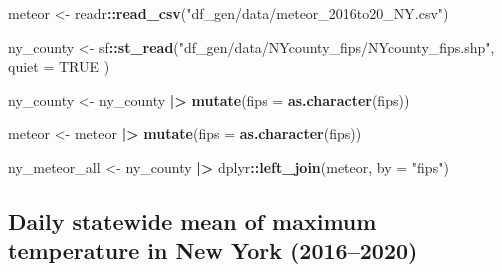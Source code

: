 \documentclass[
]{article}
\newenvironment{Shaded}{\begin{snugshade}}{\end{snugshade}}
\newcommand{\AttributeTok}[1]{\textcolor[rgb]{0.13,0.29,0.53}{#1}}
\newcommand{\ConstantTok}[1]{\textcolor[rgb]{0.56,0.35,0.01}{#1}}
\newcommand{\FunctionTok}[1]{\textcolor[rgb]{0.13,0.29,0.53}{\textbf{#1}}}
\newcommand{\NormalTok}[1]{#1}
\newcommand{\OtherTok}[1]{\textcolor[rgb]{0.56,0.35,0.01}{#1}}
\newcommand{\SpecialCharTok}[1]{\textcolor[rgb]{0.81,0.36,0.00}{\textbf{#1}}}
\newcommand{\StringTok}[1]{\textcolor[rgb]{0.31,0.60,0.02}{#1}}
\begin{document}
\begin{Shaded}
\begin{Highlighting}[]
\NormalTok{meteor }\OtherTok{\textless{}{-}}\NormalTok{ readr}\SpecialCharTok{::}\FunctionTok{read\_csv}\NormalTok{(}\StringTok{"df\_gen/data/meteor\_2016to20\_NY.csv"}\NormalTok{)}
\end{Highlighting}
\end{Shaded}

\begin{Shaded}
\begin{Highlighting}[]
\NormalTok{ny\_county }\OtherTok{\textless{}{-}}\NormalTok{ sf}\SpecialCharTok{::}\FunctionTok{st\_read}\NormalTok{(}\StringTok{"df\_gen/data/NYcounty\_fips/NYcounty\_fips.shp"}\NormalTok{,}
  \AttributeTok{quiet =} \ConstantTok{TRUE}
\NormalTok{)}
\end{Highlighting}
\end{Shaded}

\begin{Shaded}
\begin{Highlighting}[]
\NormalTok{ny\_county }\OtherTok{\textless{}{-}}\NormalTok{ ny\_county }\SpecialCharTok{|\textgreater{}}
  \FunctionTok{mutate}\NormalTok{(}\AttributeTok{fips =} \FunctionTok{as.character}\NormalTok{(fips))}

\NormalTok{meteor }\OtherTok{\textless{}{-}}\NormalTok{ meteor }\SpecialCharTok{|\textgreater{}}
  \FunctionTok{mutate}\NormalTok{(}\AttributeTok{fips =} \FunctionTok{as.character}\NormalTok{(fips))}
\end{Highlighting}
\end{Shaded}

\begin{Shaded}
\begin{Highlighting}[]
\NormalTok{ny\_meteor\_all }\OtherTok{\textless{}{-}}\NormalTok{ ny\_county }\SpecialCharTok{|\textgreater{}}
\NormalTok{  dplyr}\SpecialCharTok{::}\FunctionTok{left\_join}\NormalTok{(meteor, }\AttributeTok{by =} \StringTok{"fips"}\NormalTok{)}
\end{Highlighting}
\end{Shaded}

\subsection{Daily statewide mean of maximum temperature in New York
(2016--2020)}\label{daily-statewide-mean-of-maximum-temperature-in-new-york-20162020}
\end{document}
